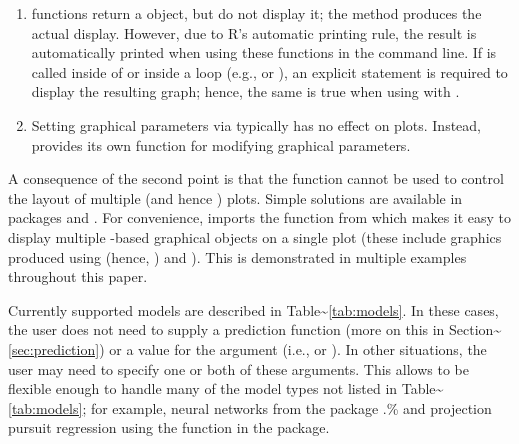 \begin{enumerate}
  \item {} functions return a  object, but do not display it; the  method produces the actual display. However, due to R's automatic printing rule, the result is automatically printed when using these functions in the command line. If  is called inside of  or inside a loop (e.g.,  or ), an explicit  statement is required to display the resulting graph; hence, the same is true when using  with .
  \item Setting graphical parameters via  typically has no effect on  plots. Instead,  provides its own  function for modifying graphical parameters.
\end{enumerate}

A consequence of the second point is that the  function cannot
be used to control the layout of multiple  (and hence
) plots. Simple solutions are available in packages
 \citep{latticeExtra-pkg} and 
\citep{gridExtra-pkg}. For convenience,  imports the
 function from  which makes it easy to
display multiple -based graphical objects on a single plot
(these include graphics produced using  (hence, )
and ). This is demonstrated in multiple examples throughout
this paper.

Currently supported models are described in
Table\textasciitilde{}\ref{tab:models}. In these cases, the user does
not need to supply a prediction function (more on this in
Section\textasciitilde{}\ref{sec:prediction}) or a value for the
 argument (i.e.,  or
). In other situations, the user may need to
specify one or both of these arguments. This allows  to be
flexible enough to handle many of the model types not listed in
Table\textasciitilde{}\ref{tab:models}; for example, neural networks
from the  package \citep{venables-modern-2002}.\% and
projection pursuit regression \citep{friedman-ppr-1981} using the
 function in the  package.

